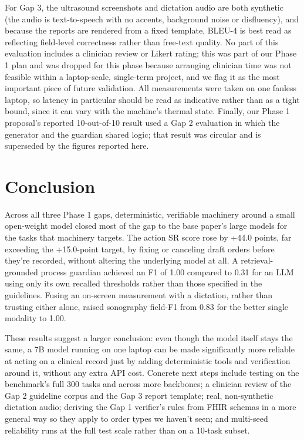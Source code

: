 \documentclass[conference]{IEEEtran}
\begin{document}
For Gap 3, the ultrasound screenshots and dictation audio are both synthetic (the audio is text-to-speech with no accents, background noise or disfluency), and because the reports are rendered from a fixed template, BLEU-4 is best read as reflecting field-level correctness rather than free-text quality. No part of this evaluation includes a clinician review or Likert rating; this was part of our Phase 1 plan and was dropped for this phase because arranging clinician time was not feasible within a laptop-scale, single-term project, and we flag it as the most important piece of future validation. All measurements were taken on one fanless laptop, so latency in particular should be read as indicative rather than as a tight bound, since it can vary with the machine's thermal state. Finally, our Phase 1 proposal's reported 10-out-of-10 result used a Gap 2 evaluation in which the generator and the guardian shared logic; that result was circular and is superseded by the figures reported here.

\section{Conclusion}

Across all three Phase 1 gaps, deterministic, verifiable machinery around a small open-weight model closed most of the gap to the base paper's large models for the tasks that machinery targets. The action SR score rose by +44.0 points, far exceeding the +15.0-point target, by fixing or canceling draft orders before they're recorded, without altering the underlying model at all. A retrieval-grounded process guardian achieved an F1 of 1.00 compared to 0.31 for an LLM using only its own recalled thresholds rather than those specified in the guidelines. Fusing an on-screen measurement with a dictation, rather than trusting either alone, raised sonography field-F1 from 0.83 for the better single modality to 1.00.

These results suggest a larger conclusion: even though the model itself stays the same, a 7B model running on one laptop can be made significantly more reliable at acting on a clinical record just by adding deterministic tools and verification around it, without any extra API cost. Concrete next steps include testing on the benchmark's full 300 tasks and across more backbones; a clinician review of the Gap 2 guideline corpus and the Gap 3 report template; real, non-synthetic dictation audio; deriving the Gap 1 verifier's rules from FHIR schemas in a more general way so they apply to order types we haven't seen; and multi-seed reliability runs at the full test scale rather than on a 10-task subset.



\end{document}
